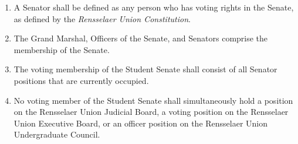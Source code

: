 \begin{enumerate}
    \item A Senator shall be defined as any person who has voting rights in the Senate, as defined by the \textit{Rensselaer Union Constitution}.
    \item The Grand Marshal, Officers of the Senate, and Senators comprise the membership of the Senate.
    \item The voting membership of the Student Senate shall consist of all Senator positions that are currently occupied.
    \item No voting member of the Student Senate shall simultaneously hold a position on the Rensselaer Union Judicial Board, a voting position on the Rensselaer Union Executive Board, or an officer position on the Rensselaer Union Undergraduate Council.
\end{enumerate}
